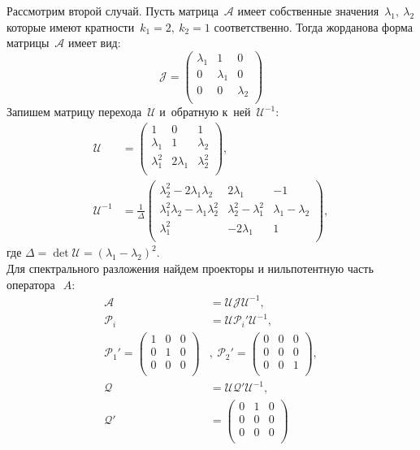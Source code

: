 Рассмотрим второй случай.		
Пусть матрица~$\mathcal{A}$ имеет собственные значения~$\lambda_1,~\lambda_2$ 
которые имеют кратности~$k_1=2,~k_2=1$ соответственно. Тогда жорданова форма матрицы~$\mathcal{A}$ имеет вид:
$$
 \mathcal{J} = 
 \begin{pmatrix}
  \lambda_1 & 1 & 0\\
  0 & \lambda_1 & 0 \\
  0 & 0 & \lambda_2 \\
 \end{pmatrix}
$$
Запишем матрицу перехода~$\mathcal{U}$ и~обратную к~ней~$\mathcal{U}^{-1}$:
$$
\begin{aligned}
 \mathcal{U} &= 
 \begin{pmatrix}
  	1 & 0 & 1\\
  	\lambda_1 & 1 & \lambda_2 \\
  	\lambda_1^2 & 2\lambda_1 & \lambda_2^2 \\
 \end{pmatrix}, \\
 \mathcal{U}^{-1} &= \frac{1}{\Delta} 
 \begin{pmatrix}
  	\lambda_2^2-2\lambda_1\lambda_2 & 2\lambda_1 & -1  \\
  	\lambda_1^2\lambda_2 - \lambda_1\lambda_2^2 & \lambda_2^2 - \lambda_1^2 & \lambda_1 - \lambda_2  \\
  	\lambda_1^2 & -2\lambda_1 & 1  \\
 \end{pmatrix},
\end{aligned}
$$
где $\Delta = \det \mathcal{U} = (\lambda_1-\lambda_2)^2$. \\
Для спектрального разложения найдем проекторы и нильпотентную часть оператора~$\ A$:
$$
	\begin{aligned}
		\mathcal{A} &= \mathcal{U}\mathcal{J}\mathcal{U}^{-1}, \\
		\mathcal{P}_i &= \mathcal{U}\mathcal{P}_i'\mathcal{U}^{-1}, \\
		\mathcal{P}_1' = 
		\begin{pmatrix}
  			1 & 0 & 0\\
  			0 & 1 & 0 \\
  			0 & 0 & 0 \\
 		\end{pmatrix}&,\  
 		\mathcal{P}_2' =
		\begin{pmatrix}
  			0 & 0 & 0\\
  			0 & 0 & 0 \\
  			0 & 0 & 1 \\
 		\end{pmatrix},\\ 
 		\mathcal{Q} &= \mathcal{U}\mathcal{Q}'\mathcal{U}^{-1}, \\
 		\mathcal{Q}' &= 
		\begin{pmatrix}
  			0 & 1 & 0\\
  			0 & 0 & 0 \\
  			0 & 0 & 0 \\
 		\end{pmatrix}
	\end{aligned}
$$
